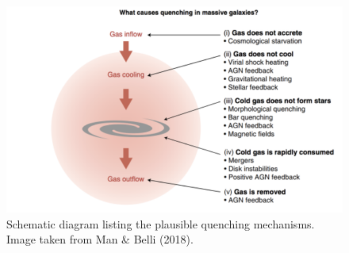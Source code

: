 \documentclass[a4paper,10pt]{article}
\begin{document}
\begin{figure}[t]
    \centering
    \includegraphics[width=16cm]{figures/quenching.png}
    \caption{\footnotesize{Schematic diagram listing the plausible quenching mechanisms. Image taken from Man \& Belli (2018).}}
    \label{fig:quenching}
\end{figure}
\end{document}
